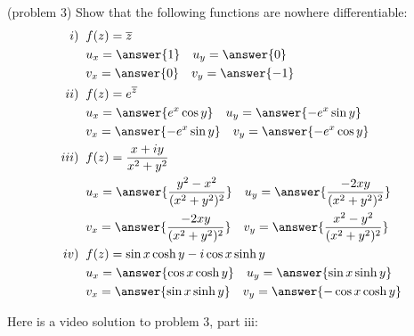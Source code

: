 \documentclass[handout]{ximera}
\begin{document}
\begin{problem}(problem 3)
Show that the following functions are nowhere differentiable:
\begin{align*}
i) \;\; & f(z) = \overline{z} \\
& u_x = \answer{1} \quad u_y = \answer{0} \\
& v_x = \answer{0} \quad v_y = \answer{-1} \\
ii) \;\; & f(z) = e^{\overline{z}} \\
& u_x = \answer{e^x \cos y} \quad u_y = \answer{-e^x \sin y} \\
& v_x = \answer{-e^x \sin y} \quad v_y = \answer{-e^x \cos y} \\
iii) \;\; & f(z) = \frac{x+iy}{x^2 + y^2} \\
& u_x = \answer{\frac{y^2 -x^2}{(x^2 +y^2)^2}} \quad u_y = \answer{\frac{-2xy}{(x^2 +y^2)^2}}\\
& v_x = \answer{\frac{-2xy}{(x^2 +y^2)^2}} \quad v_y = \answer{\frac{x^2 - y^2}{(x^2 +y^2)^2}} \\
iv) \;\; & f(z) = \sin x \cosh y - i \cos x \sinh y \\
& u_x = \answer{\cos x \cosh y} \quad u_y = \answer{\sin x \sinh y} \\ 
& v_x = \answer{\sin x \sinh y} \quad v_y = \answer{-\cos x \cosh y} 
\end{align*}
\end{problem}

Here is a video solution to problem 3, part iii:\\
\begin{foldable}
\end{foldable}
\end{document}
